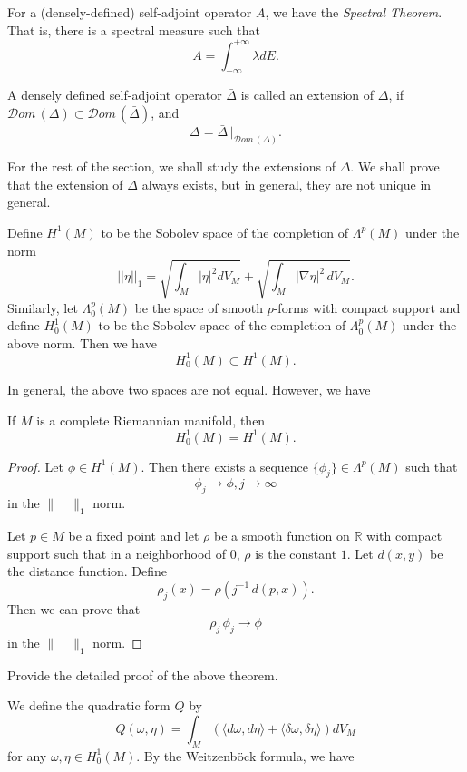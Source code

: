 For a (densely-defined) self-adjoint operator $A$, we have the {\it Spectral Theorem}. That is, there is a spectral measure such that
\[
A=\int_{-\infty}^{+\infty}\lambda dE.
\]

A densely defined self-adjoint operator $\bar\Delta$ is called an extension of $\Delta$, if ${\mathcal Dom}\, (\Delta)\subset {\mathcal Dom}\, (\bar\Delta)$, and 
\[
\Delta=\bar\Delta\,|_{{\mathcal Dom}\, (\Delta)}.
\]


For the rest of the section, we shall study the extensions of $\Delta$. We shall prove that the extension of $\Delta$ always exists, but in general, they are not unique in general.



Define $H^1(M)$ to be the Sobolev space of the completion of $\Lambda^p(M)$ under the norm
\[
||\eta||_1=\sqrt{\int_M|\eta|^2 dV_M}+\sqrt{\int_M|\nabla\eta|^2\, dV_M}.
\]
Similarly, let $\Lambda_0^p(M)$ be the space of smooth $p$-forms with compact support and define $H_0^1(M)$ to be the Sobolev space of the completion of $\Lambda_0^p(M)$ under the above norm. Then we have
\[
H_0^1(M)\subset H^1(M).
\]

In general, the above two spaces are not equal. However, we have 

\begin{theorem}\label{thm7}
If $M$ is a complete Riemannian manifold, then
\[
H_0^1(M)= H^1(M).
\]
\end{theorem}

\begin{proof}
Let $\phi\in H^1(M)$. Then there exists a sequence $\{\phi_j\}\in \Lambda^p(M)$ such that 
\[
\phi_j\to \phi, j\to\infty
\]
in the $\|\quad\|_1$ norm. 

Let $p\in M$ be a fixed point and let $\rho$ be a smooth function on $\mathbb R$ with compact support  such that in a neighborhood of $0$, $\rho$ is the constant $1$. Let $d(x,y)$ be the distance function. Define
\[
\rho_j(x)=\rho(j^{-1}\,d(p,x)).
\]
Then we can prove that 
\[
\rho_j\,\phi_j\to\phi
\]
in the $\|\quad\|_1$ norm. 
\end{proof}


\begin{ex} Provide the detailed proof of the above theorem.\end{ex}

We define the quadratic form $Q$  by
\[
Q(\omega,\eta)=\int_M\left(\langle d\omega,d\eta \rangle +\langle\delta\omega,\delta\eta\rangle\right) dV_M
\]
for any $\omega,\eta\in H_0^1(M)$.  By the Weitzenb\"ock formula, we have

